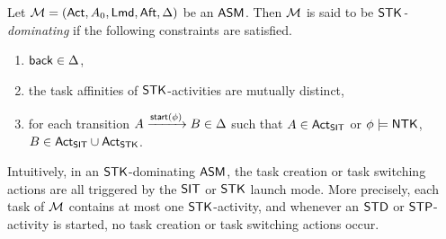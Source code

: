 \begin{definition} \label{def:stk-amass}
Let ${\mathcal{M} } = ({\sf Act}, A_0, {\sf Lmd}, {\sf Aft}, \Delta)$ be an $\textsf{ASM}$. Then ${\mathcal{M} }$ is  said to be \emph{$\mathsf{STK}$-dominating} if the following constraints are satisfied.
		\begin{enumerate}
			\item ${\mathsf{back} }\in\Delta$,
			\item the task affinities of ${\sf STK}$-activities are mutually distinct,
			\item for each transition $A \xrightarrow{{\mathsf{start} }(\phi)} B\in\Delta$ such that $A \in {\sf Act}_{\sf SIT}$ or $\phi\models {\sf NTK}$, $B \in {\sf Act}_{{\sf SIT}} \cup {\sf Act}_{{\sf STK}}$.
		\end{enumerate}
\end{definition}

Intuitively, in an $\mathsf{STK}$-dominating $\textsf{ASM}$, the task creation or task switching actions are all triggered by the ${\sf SIT}$ or ${\sf STK}$ launch mode. More precisely,  
each task of ${\mathcal{M} }$ contains at most one $\mathsf{STK}$-activity, and  %
whenever an ${\sf STD}$ or ${\sf STP}$-activity is started, no task creation or task switching actions occur.  %
	
